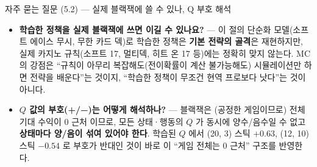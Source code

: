 \begin{frame}{자주 묻는 질문 (5.2) --- 실제 블랙잭에 쓸 수
있나, Q 부호 해석}
  \begin{itemize}
    \item \textbf{학습한 정책을 실제 블랙잭에 쓰면 이길 수
      있나요?} --- 이 절의 단순화 모델(소프트 에이스 무시,
      무한 카드 덱)로 학습한 정책은 \textbf{기본 전략의
      골격}은 재현하지만, 실제 카지노 규칙(소프트 17,
      멀티덱, 히트 온 17 등)에는 정확히 맞지 않는다. MC 의
      강점은 ``규칙이 아무리 복잡해도(전이확률이 계산
      불가능해도) 시뮬레이션만 하면 전략을 배운다''는 것이지,
      ``학습한 정책이 무조건 현역 프로보다 낫다''는 것이
      아니다.
    \item \textbf{$Q$ 값의 부호(+/−)는 어떻게 해석하나?} ---
      블랙잭은 (공정한 게임이므로) 전체 기대 수익이 0 근처
      이므로, 모든 상태·행동의 $Q$ 가 동시에 양수/음수일 수
      없고 \textbf{상태마다 양/음이 섞여 있어야 한다}. 학습된
      $Q$ 에서 (20, 3) 스틱 $+0.63$, (12, 10) 스틱 $-0.54$ 로
      부호가 반대인 것이 바로 이 ``게임 전체는 0 근처''
      구조를 반영한다.
  \end{itemize}
\end{frame}
